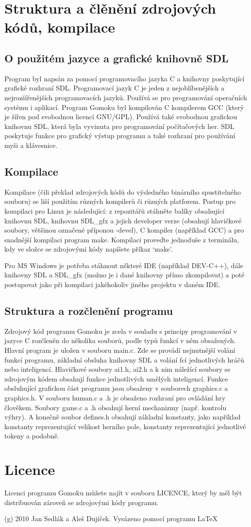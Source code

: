 \documentclass[a4paper,11pt,titlepage]{article}
\begin{document}
\section{Struktura a člěnění zdrojových kódů, kompilace}
\subsection{O použitém jazyce a grafické knihovně SDL}
Program byl napsán za pomocí programovacího jazyka C a knihovny poskytující grafické rozhraní SDL. Programovací jazyk C je jeden z nej\-ob\-lí\-be\-něj\-ších a nejrozšířenějších programovacích jazyků. Používá se pro programování operačních systému i aplikací. Program Gomoku byl kompilován C kompilerem GCC (který je šířen pod svobodnou licencí GNU/GPL). Používá také svobodnou grafickou knihovnu SDL, která byla vyvinuta pro programování počítačových her. SDL poskytuje funkce pro grafický výstup programu a také rozhraní pro používání myši a klávesnice.
\subsection{Kompilace}
Kompilace (čili překlad zdrojových kódů do výsledného binárního spustitelného souboru) se liší použitím různých kompilerů či různých platforem. Postup pro kompilaci pro Linux je následující: z repozitářů stáhněte balíky obsahující knihovnu SDL, knihovnu SDL\_gfx a jejich developer verze (obsahují hlavičkové soubory, většinou označené příponou -devel), C kompiler (například GCC) a pro snadnější kompilaci program make. Kompilaci proveďte jednoduše z terminálu, kdy ve složce se zdrojovými kódy napíšete příkaz `make'. 

Pro MS Windows je potřeba stáhnout některé IDE (například DEV-C++), dále knihovny SDL a SDL\_gfx (možno je i dané knihovny přímo zkompilovat) a poté postupovat jako při kompilaci jakéhokoliv jiného projektu v daném IDE.
\subsection{Struktura a rozčlenění programu}
Zdrojový kód programu Gomoku je zcela v souladu s principy programování v jazyce C rozčleněn do několika souborů, podle typů funkcí v něm ob\-sa\-že\-ných. Hlavní program je uložen v souboru main.c. Zde se provádí nejnutnější volání funkcí programu, základní obsluha knihovny SDL a volání fcí jednotlivých hráčů nebo inteligencí. Hlavičkové soubory ai1.h, ai2.h a k nim náležící soubory se zdrojovým kódem obsahují funkce jednotlivých umělých inteligencí. Funkce obsluhující grafickou část programu jsou obsaženy v souborech graphics.c a graphics.h. V souboru human.c a .h je obsaženo rozhraní pro ovládání hry člověkem. Soubory game.c a .h obsahují herní mechanizmy (např. kontrolu výhry). A konečně soubor defines.h obsahují základní konstanty, jako například konstanty reprezentující velikost herního pole, konstanty reprezentující jednotlivé tokeny a podobně.
\section{Licence}
Licenci programu Gomoku můžete najít v souboru LICENCE, který by měl být distribuován zároveň se zdrojovými kódy programu.

(g) 2010 Jan Sedlák a Aleš Dujíček. Vysázeno pomocí programu \LaTeX
\end{document}
